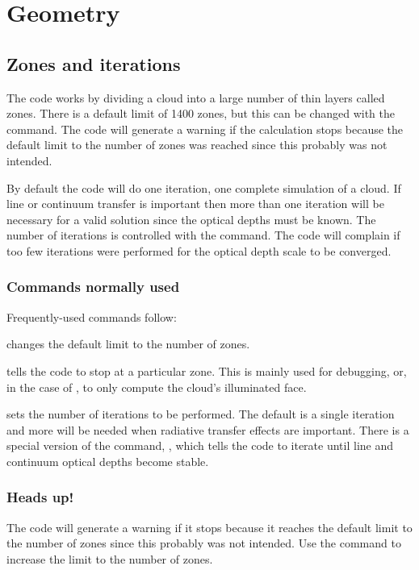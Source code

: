 \documentclass[12pt,twoside]{article}
\begin{document}
{\section{Geometry}
\label{sec:Geometry}

\subsection{Zones and iterations}

The code works by dividing a cloud into a large number of thin layers
called zones.  There is a default limit of 1400 zones, but this can be
changed with the  command.
The code will generate a warning if
the calculation stops because the default limit to the number of zones was
reached since this probably was not intended.

By default the code will do one iteration, one complete simulation of
a cloud.  If line or continuum transfer is important then more than one
iteration will be necessary for a valid solution since the optical depths
must be known.  The number of iterations is controlled with the
command.  The code will complain if too few iterations were performed for
the optical depth scale to be converged.

\subsubsection{Commands normally used}

Frequently-used commands follow:

 changes the default limit to the number of zones.

 tells the code to stop
at a particular zone.  This is mainly
used for debugging, or, in the case of , to only compute the cloud's illuminated face.

 sets the number of iterations
to be performed.  The default is
a single iteration and more will be needed when radiative transfer effects
are important.  There is a special version of the command,
,
which tells the code to iterate until line and continuum optical
depths become stable.

\subsubsection{Heads up!}

The code will generate a warning
if it stops because it reaches the
default limit to the number of zones since this probably was not intended.
Use the  command to increase
the limit to the number of zones.

}
\end{document}
